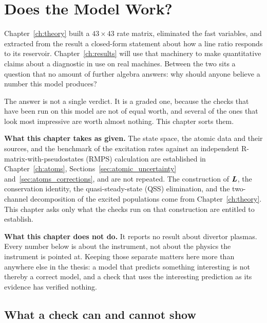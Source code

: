 \chapter{Does the Model Work?}
\label{ch:validation}

Chapter~\ref{ch:theory} built a $43\times43$ rate matrix, eliminated the fast
variables, and extracted from the result a closed-form statement about how a
line ratio responds to its reservoir. Chapter~\ref{ch:results} will use that
machinery to make quantitative claims about a diagnostic in use on real
machines. Between the two sits a question that no amount of further algebra
answers: why should anyone believe a number this model produces?

The answer is not a single verdict. It is a graded one, because the
checks that have been run on this model are not of equal worth, and several of
the ones that look most impressive are worth almost nothing. This chapter sorts
them.

\medskip
\noindent\textbf{What this chapter takes as given.} The state space, the atomic
data and their sources, and the benchmark of the excitation rates against an
independent R-matrix-with-pseudostates (RMPS) calculation are established in
Chapter~\ref{ch:atoms}, Sections~\ref{sec:atomic_uncertainty}
and~\ref{sec:atoms_corrections}, and are not repeated. The construction of
$\bm{L}$, the conservation identity, the quasi-steady-state (QSS) elimination,
and the two-channel decomposition of the excited populations come from
Chapter~\ref{ch:theory}. This chapter asks only what the checks run on that
construction are entitled to establish.

\medskip
\noindent\textbf{What this chapter does not do.} It reports no result about
divertor plasmas. Every number below is about the instrument, not about the
physics the instrument is pointed at. Keeping those separate matters here more
than anywhere else in the thesis: a model that predicts something interesting
is not thereby a correct model, and a check that uses the interesting
prediction as its evidence has verified nothing.

\section{What a check can and cannot show}
\label{sec:gate_philosophy}

